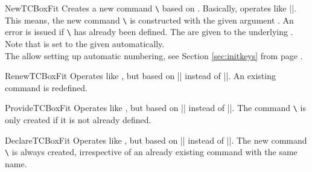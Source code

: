 \clearpage

\begin{docCommand}{NewTCBoxFit}{}
  Creates a new command \texttt{\textbackslash} based on .
  Basically,  operates like |\NewDocumentCommand|. This means,
  the new command \texttt{\textbackslash} is constructed with the given argument .
  An error is issued if \texttt{\textbackslash} has already been defined.
  The  are given to the underlying .\\
  Note that  is set to the given 
  automatically.\\
  The  allow setting up automatic numbering,
  see Section \ref{sec:initkeys} from page \pageref{sec:initkeys}.

\end{docCommand}

\begin{docCommand}{RenewTCBoxFit}{}
  Operates like , but based on |\RenewDocumentCommand| instead of |\NewDocumentCommand|.
  An existing command is redefined.
\end{docCommand}

\begin{docCommand}{ProvideTCBoxFit}{}
  Operates like , but based on |\ProvideDocumentCommand| instead of |\NewDocumentCommand|.
  The command \texttt{\textbackslash} is only created if it is not already defined.
\end{docCommand}

\begin{docCommand}{DeclareTCBoxFit}{}
  Operates like , but based on |\DeclareDocumentCommand| instead of |\NewDocumentCommand|.
  The new command \texttt{\textbackslash} is always created, irrespective of an already existing
  command with the same name.
\end{docCommand}

